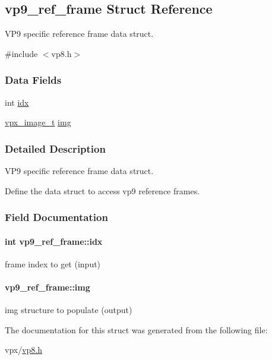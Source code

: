 \hypertarget{structvp9__ref__frame}{}\subsection{vp9\+\_\+ref\+\_\+frame Struct Reference}
\label{structvp9__ref__frame}


V\+P9 specific reference frame data struct.  




{\ttfamily \#include $<$vp8.\+h$>$}

\subsubsection*{Data Fields}
\begin{DoxyCompactItemize}
\item 
int \hyperlink{structvp9__ref__frame_a26e0d119a61c29b72c6ccb91748b6b82}{idx}
\item 
\hyperlink{vpx__image_8h_abf5ac962cc6d71b4f0e39b1b0d033e55}{vpx\+\_\+image\+\_\+t} \hyperlink{structvp9__ref__frame_ab8d92d960007586ea7c8cd9306e98db2}{img}
\end{DoxyCompactItemize}


\subsubsection{Detailed Description}
V\+P9 specific reference frame data struct. 

Define the data struct to access vp9 reference frames. 

\subsubsection{Field Documentation}
\paragraph[{\texorpdfstring{idx}{idx}}]{\setlength{\rightskip}{0pt plus 5cm}int vp9\+\_\+ref\+\_\+frame\+::idx}\hypertarget{structvp9__ref__frame_a26e0d119a61c29b72c6ccb91748b6b82}{}\label{structvp9__ref__frame_a26e0d119a61c29b72c6ccb91748b6b82}
frame index to get (input) 
\paragraph[{\texorpdfstring{img}{img}}]{ vp9\+\_\+ref\+\_\+frame\+::img}\hypertarget{structvp9__ref__frame_ab8d92d960007586ea7c8cd9306e98db2}{}\label{structvp9__ref__frame_ab8d92d960007586ea7c8cd9306e98db2}
img structure to populate (output) 

The documentation for this struct was generated from the following file\+:\begin{DoxyCompactItemize}
\item 
vpx/\hyperlink{vp8_8h}{vp8.\+h}\end{DoxyCompactItemize}
